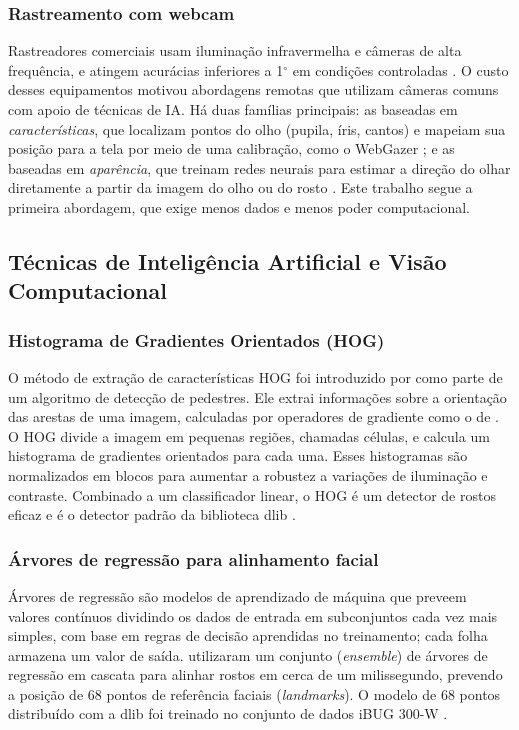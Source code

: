 \documentclass[sigconf, nonacm, language=english, language=portuguese, natbib=false]{acmart}
\begin{document}
\subsubsection{Rastreamento com webcam}
Rastreadores comerciais usam iluminação infravermelha e câmeras de alta frequência, e atingem acurácias inferiores a 1$^\circ$ em condições controladas \cite{holmqvist2011eye}. O custo desses equipamentos motivou abordagens remotas que utilizam câmeras comuns com apoio de técnicas de IA. Há duas famílias principais: as baseadas em \emph{características}, que localizam pontos do olho (pupila, íris, cantos) e mapeiam sua posição para a tela por meio de uma calibração, como o WebGazer \cite{papoutsaki2016webgazer}; e as baseadas em \emph{aparência}, que treinam redes neurais para estimar a direção do olhar diretamente a partir da imagem do olho ou do rosto \cite{krafka2016eye, zhang18_etra, Park2018ETRA, Park2020ECCV}. Este trabalho segue a primeira abordagem, que exige menos dados e menos poder computacional.

\subsection{Técnicas de Inteligência Artificial e Visão Computacional}

\subsubsection{Histograma de Gradientes Orientados (HOG)}
O método de extração de características HOG foi introduzido por \textcite{Dalal2005} como parte de um algoritmo de detecção de pedestres. Ele extrai informações sobre a orientação das arestas de uma imagem, calculadas por operadores de gradiente como o de \textcite{Sobel1973}. O HOG divide a imagem em pequenas regiões, chamadas células, e calcula um histograma de gradientes orientados para cada uma. Esses histogramas são normalizados em blocos para aumentar a robustez a variações de iluminação e contraste. Combinado a um classificador linear, o HOG é um detector de rostos eficaz e é o detector padrão da biblioteca dlib \cite{King2009}.

\subsubsection{Árvores de regressão para alinhamento facial}
Árvores de regressão são modelos de aprendizado de máquina que preveem valores contínuos dividindo os dados de entrada em subconjuntos cada vez mais simples, com base em regras de decisão aprendidas no treinamento; cada folha armazena um valor de saída. \textcite{Kazemi2014} utilizaram um conjunto (\emph{ensemble}) de árvores de regressão em cascata para alinhar rostos em cerca de um milissegundo, prevendo a posição de 68 pontos de referência faciais (\emph{landmarks}). O modelo de 68 pontos distribuído com a dlib foi treinado no conjunto de dados iBUG 300-W \cite{sagonas2013}.
\end{document}
